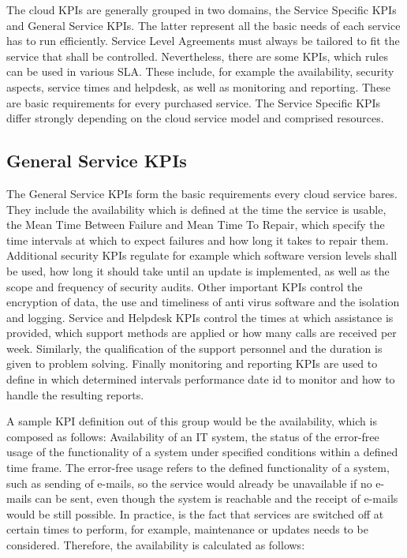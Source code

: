 The cloud KPIs are generally grouped in two domains, the Service Specific KPIs and General Service KPIs. The latter represent all the basic needs of each service has to run efficiently. Service Level Agreements must always be tailored to fit the service that shall be controlled. Nevertheless, there are some KPIs, which rules can be used in various SLA.  These include, for example the availability, security aspects, service times and helpdesk, as well as monitoring and reporting. These are basic requirements for every purchased service. The Service Specific KPIs differ strongly depending on the cloud service model and comprised resources.

\subsection{General Service KPIs } 
 The General Service KPIs form the basic requirements every cloud service bares. They include the availability  which is defined at the time the service is usable, the  Mean Time Between Failure and Mean Time To Repair, which specify the time intervals at which to expect failures and how long it takes to repair them. Additional security KPIs regulate for example which software version levels shall be used, how long it should take until an update is implemented, as well as the scope and frequency of security audits. Other important KPIs control the encryption of data, the use and timeliness of anti virus software and the isolation and logging. Service and Helpdesk KPIs control the times at which assistance is provided, which support methods are applied or how many calls are received per week. Similarly, the qualification of the support personnel and the duration is given to problem solving. Finally monitoring and reporting KPIs are used to define in which determined intervals performance date id to monitor and how to handle the resulting reports. 
 
 A sample KPI definition out of this group would be the availability, which is composed as follows: Availability of an IT system, the status of the error-free usage of the functionality of a system under specified conditions within a defined time frame. The error-free usage refers to the defined functionality of a system, such as sending of e-mails, so the service would already be unavailable if no e-mails can be sent, even though the system is reachable and the receipt of e-mails would be still possible. In practice, is the fact that services are switched off at certain times to perform, for example, maintenance or updates needs to be considered. Therefore,  the availability is calculated  as follows:\\
 
